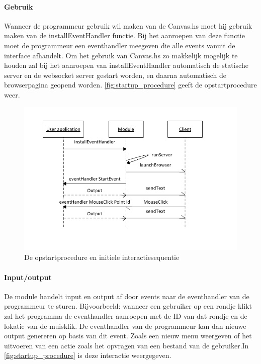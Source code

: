 \paragraph{Gebruik} Wanneer de programmeur gebruik wil maken van de Canvas.hs moet hij gebruik maken van de installEventHandler functie. Bij het aanroepen van deze functie moet de programmeur een eventhandler meegeven die alle events vanuit de interface afhandelt. Om het gebruik van Canvas.hs zo makkelijk mogelijk te houden zal bij het aanroepen van installEventHandler automatisch de statische server en de websocket server gestart worden, en daarna automatisch de browserpagina geopend worden. \autoref{fig:startup_procedure} geeft de opstartprocedure weer.

\begin{figure}
\begin{center}
\includegraphics[keepaspectratio,width=\textwidth]{./images/module_startup_procedure_interaction.pdf}
\caption{De opstartprocedure en initiele interactiesequentie}
\label{fig:startup_procedure}
\end{center}
\end{figure}
\paragraph{Input/output}
De module handelt input en output af door events naar de eventhandler van de programmeur te sturen. Bijvoorbeeld: wanneer een gebruiker op een rondje klikt zal het programma de eventhandler aanroepen met de ID van dat rondje en de lokatie van de muisklik. De eventhandler van de programmeur kan dan nieuwe output genereren op basis van dit event. Zoals een nieuw menu weergeven of het uitvoeren van een actie zoals het opvragen van een bestand van de gebruiker.In \autoref{fig:startup_procedure} is deze interactie weergegeven.

